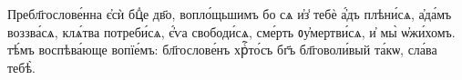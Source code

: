 \label{preblago}

\hKv Пребл҃гослове́нна є҆сѝ бцⷣе дв҃о, вопло́щьшимъ бо сѧ  и҆з̾ тебѐ а҆́дъ плѣни́сѧ, а҆да́мъ воззва́сѧ, клѧ́тва  потреби́сѧ, є҆́ѵа свободи́сѧ, сме́рть ᲂу҆мертви́сѧ, и҆ мы̀  ѡ҆жи́хомъ. тѣ́мъ воспѣва́юще вопїе́мъ: бл҃гослове́нъ  хрⷭ҇то́съ бг҃ъ бл҃говоли́вый та́кѡ, сла́ва тебѣ̀. 

